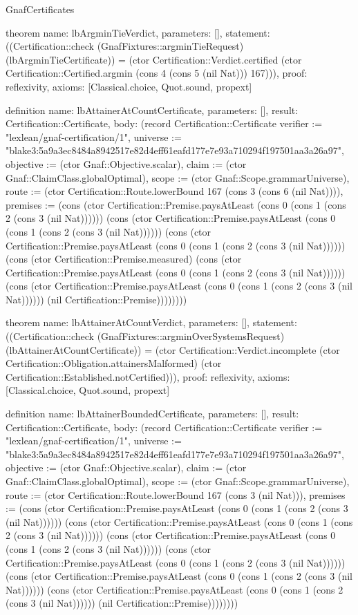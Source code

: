 \begin{lexlean}{GnafCertificates}
\begin{semanticmodule}
theorem{
  name: lbArgminTieVerdict,
  parameters: [],
  statement: ((Certification::check (GnafFixtures::argminTieRequest) (lbArgminTieCertificate)) = (ctor Certification::Verdict.certified (ctor Certification::Certified.argmin (cons 4 (cons 5 (nil Nat))) 167))),
  proof: reflexivity{},
  axioms: [Classical.choice, Quot.sound, propext]
}

definition{
  name: lbAttainerAtCountCertificate,
  parameters: [],
  result: Certification::Certificate,
  body: (record Certification::Certificate {verifier := "lexlean/gnaf-certification/1", universe := "blake3:5a9a3ec8484a8942517e82d4eff61eafd177e7e93a710294f197501aa3a26a97", objective := (ctor Gnaf::Objective.scalar), claim := (ctor Gnaf::ClaimClass.globalOptimal), scope := (ctor Gnaf::Scope.grammarUniverse), route := (ctor Certification::Route.lowerBound 167 (cons 3 (cons 6 (nil Nat)))), premises := (cons (ctor Certification::Premise.paysAtLeast (cons 0 (cons 1 (cons 2 (cons 3 (nil Nat)))))) (cons (ctor Certification::Premise.paysAtLeast (cons 0 (cons 1 (cons 2 (cons 3 (nil Nat)))))) (cons (ctor Certification::Premise.paysAtLeast (cons 0 (cons 1 (cons 2 (cons 3 (nil Nat)))))) (cons (ctor Certification::Premise.measured) (cons (ctor Certification::Premise.paysAtLeast (cons 0 (cons 1 (cons 2 (cons 3 (nil Nat)))))) (cons (ctor Certification::Premise.paysAtLeast (cons 0 (cons 1 (cons 2 (cons 3 (nil Nat)))))) (nil Certification::Premise)))))))})
}

theorem{
  name: lbAttainerAtCountVerdict,
  parameters: [],
  statement: ((Certification::check (GnafFixtures::argminOverSystemsRequest) (lbAttainerAtCountCertificate)) = (ctor Certification::Verdict.incomplete (ctor Certification::Obligation.attainersMalformed) (ctor Certification::Established.notCertified))),
  proof: reflexivity{},
  axioms: [Classical.choice, Quot.sound, propext]
}

definition{
  name: lbAttainerBoundedCertificate,
  parameters: [],
  result: Certification::Certificate,
  body: (record Certification::Certificate {verifier := "lexlean/gnaf-certification/1", universe := "blake3:5a9a3ec8484a8942517e82d4eff61eafd177e7e93a710294f197501aa3a26a97", objective := (ctor Gnaf::Objective.scalar), claim := (ctor Gnaf::ClaimClass.globalOptimal), scope := (ctor Gnaf::Scope.grammarUniverse), route := (ctor Certification::Route.lowerBound 167 (cons 3 (nil Nat))), premises := (cons (ctor Certification::Premise.paysAtLeast (cons 0 (cons 1 (cons 2 (cons 3 (nil Nat)))))) (cons (ctor Certification::Premise.paysAtLeast (cons 0 (cons 1 (cons 2 (cons 3 (nil Nat)))))) (cons (ctor Certification::Premise.paysAtLeast (cons 0 (cons 1 (cons 2 (cons 3 (nil Nat)))))) (cons (ctor Certification::Premise.paysAtLeast (cons 0 (cons 1 (cons 2 (cons 3 (nil Nat)))))) (cons (ctor Certification::Premise.paysAtLeast (cons 0 (cons 1 (cons 2 (cons 3 (nil Nat)))))) (cons (ctor Certification::Premise.paysAtLeast (cons 0 (cons 1 (cons 2 (cons 3 (nil Nat)))))) (nil Certification::Premise)))))))})
}


\end{semanticmodule}
\end{lexlean}
